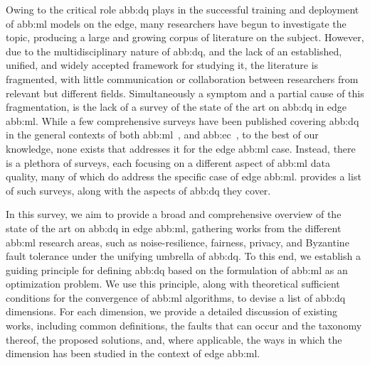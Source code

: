 
Owing to the critical role \gls{abb:dq} plays
in the successful training and deployment of \gls{abb:ml} models on the edge,
many researchers have begun to investigate the topic,
producing a large and growing corpus of literature on the subject.
However, due to the multidisciplinary nature of \gls{abb:dq},
and the lack of an established, unified, and widely accepted framework for studying it,
the literature is fragmented,
with little communication or collaboration
between researchers from relevant but different fields.
Simultaneously a symptom and a partial cause of this fragmentation,
is the lack of a survey of the state of the art
on \gls{abb:dq} in edge \gls{abb:ml}.
While a few comprehensive surveys have been published covering \gls{abb:dq}
in the general contexts of both
\gls{abb:ml}~\cite{gongDiversityMachineLearning2019},
and \gls{abb:ec}~\cite{karkouchDataQualityInternet2016},
to the best of our knowledge,
none exists that addresses it for the edge \gls{abb:ml} case.
Instead, there is a plethora of surveys,
each focusing on a different aspect of \gls{abb:ml} data quality,
many of which do address the specific case of edge \gls{abb:ml}.
 provides a list of such surveys,
along with the aspects of \gls{abb:dq} they cover.





In this survey, we aim to provide a broad and comprehensive overview
of the state of the art on \gls{abb:dq} in edge \gls{abb:ml},
gathering works from the different \gls{abb:ml} research areas,
such as noise-resilience, fairness, privacy, and Byzantine fault tolerance
under the unifying umbrella of \gls{abb:dq}.
To this end, we establish a guiding principle for defining \gls{abb:dq}
based on the formulation of \gls{abb:ml} as an optimization problem.
We use this principle, along with theoretical sufficient conditions
for the convergence of \gls{abb:ml} algorithms,
to devise a list of \gls{abb:dq} dimensions.
For each dimension, we provide a detailed discussion of existing works,
including common definitions, the faults that can occur and the taxonomy thereof,
the proposed solutions,
and, where applicable, the ways in which the dimension has been studied
in the context of edge \gls{abb:ml}.

